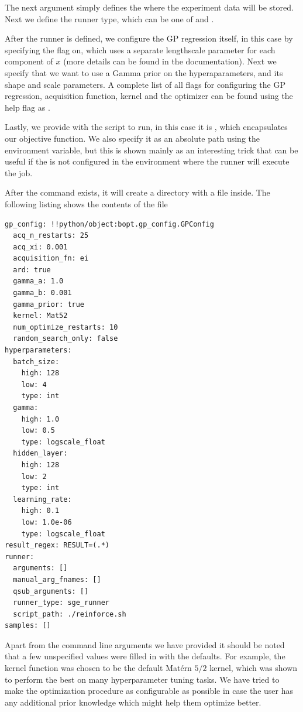 The next argument  simply defines the  where the experiment data will be stored. Next we define the runner type, which can be one of  and .

After the runner is defined, we configure the GP regression itself, in this case by specifying the  flag on, which uses a separate lengthscale parameter for each component of $x$ (more details can be found in the \cite{gpy} documentation). Next we specify that we want to use a Gamma prior on the hyperaparameters, and its shape and scale parameters. A complete list of all flags for configuring the GP regression, acquisition function, kernel and the optimizer can be found using the help flag as .

Lastly, we provide \bopt with the script to run, in this case it is , which encapsulates our objective function. We also specify it as an absolute path using the  environment variable, but this is shown mainly as an interesting trick that can be useful if the  is not configured in the environment where the runner will execute the job.

After the command exists, it will create a directory  with a  file inside. The following listing shows the contents of the file

\begin{center}
\begin{verbatim}
gp_config: !!python/object:bopt.gp_config.GPConfig
  acq_n_restarts: 25
  acq_xi: 0.001
  acquisition_fn: ei
  ard: true
  gamma_a: 1.0
  gamma_b: 0.001
  gamma_prior: true
  kernel: Mat52
  num_optimize_restarts: 10
  random_search_only: false
hyperparameters:
  batch_size:
    high: 128
    low: 4
    type: int
  gamma:
    high: 1.0
    low: 0.5
    type: logscale_float
  hidden_layer:
    high: 128
    low: 2
    type: int
  learning_rate:
    high: 0.1
    low: 1.0e-06
    type: logscale_float
result_regex: RESULT=(.*)
runner:
  arguments: []
  manual_arg_fnames: []
  qsub_arguments: []
  runner_type: sge_runner
  script_path: ./reinforce.sh
samples: []
\end{verbatim}
\end{center}

Apart from the command line arguments we have provided it should be noted that a few unspecified values were filled in with the defaults. For example, the kernel function was chosen to be the default Mat\'ern $5/2$ kernel, which was shown \citep{snoek2012practical} to perform the best on many hyperparameter tuning tasks. We have tried to make the optimization procedure as configurable as possible in case the user has any additional prior knowledge which might help them optimize better.

